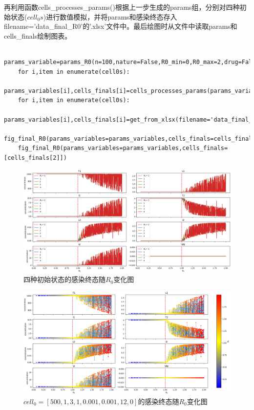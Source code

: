 \documentclass{ctexart}
\begin{document}
    再利用函数cells\_processes\_params()根据上一步生成的params组，分别对四种初始状态($cell_{0}s$)进行数值模拟，并将params和感染终态存入filename='data\_final\_R0'的'.xlsx'文件中。最后绘图时从文件中读取params和cells\_finals绘制图表。
    \begin{lstlisting}
    params_variable=params_R0(n=100,nature=False,R0_min=0,R0_max=2,drug=False)
    for i,item in enumerate(cell0s):
        params_variables[i],cells_finals[i]=cells_processes_params(params_variable=params_variable,cell0=item,order='final',filename='data_final_R0',sheet_name=str(i))
    for i,item in enumerate(cell0s):
        params_variables[i],cells_finals[i]=get_from_xlsx(filename='data_final_R0',sheet_name=str(i))
    fig_final_R0(params_variables=params_variables,cells_finals=cells_finals)
    fig_final_R0(params_variables=params_variables,cells_finals=[cells_finals[2]])
\end{lstlisting}
    \begin{figure}[H]
        \centering
        \includegraphics[width=0.95\linewidth]{2.1.png}
        \caption{四种初始状态的感染终态随$R_{0}$变化图}
        \label{fig.2.1}
    \end{figure}
    \begin{figure}[H]
        \centering
        \includegraphics[width=0.95\linewidth]{2.2.png}
        \caption{$cell_{0}=[500,1,3,1,0.001,0.001,12,0]$的感染终态随$R_{0}$变化图}
        \label{fig.2.2}
    \end{figure}
\end{document}
